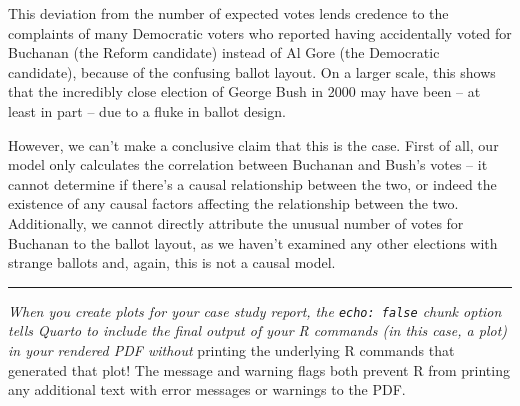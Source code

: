 \documentclass[
  letterpaper,
  DIV=11,
  numbers=noendperiod]{scrartcl}
\newenvironment{Shaded}{\begin{snugshade}}{\end{snugshade}}
\newcommand{\CommentTok}[1]{\textcolor[rgb]{0.37,0.37,0.37}{#1}}
\begin{document}
This deviation from the number of expected votes lends credence to the
complaints of many Democratic voters who reported having accidentally
voted for Buchanan (the Reform candidate) instead of Al Gore (the
Democratic candidate), because of the confusing ballot layout. On a
larger scale, this shows that the incredibly close election of George
Bush in 2000 may have been -- at least in part -- due to a fluke in
ballot design.

However, we can't make a conclusive claim that this is the case. First
of all, our model only calculates the correlation between Buchanan and
Bush's votes -- it cannot determine if there's a causal relationship
between the two, or indeed the existence of any causal factors affecting
the relationship between the two. Additionally, we cannot directly
attribute the unusual number of votes for Buchanan to the ballot layout,
as we haven't examined any other elections with strange ballots and,
again, this is not a causal model.

\begin{center}\rule{0.5\linewidth}{0.5pt}\end{center}

\emph{When you create plots for your case study report, the
\texttt{echo:\ false} chunk option tells Quarto to include the final
output of your R commands (in this case, a plot) in your rendered PDF
without} printing the underlying R commands that generated that plot!
The message and warning flags both prevent R from printing any
additional text with error messages or warnings to the PDF.

\begin{Shaded}
\end{Shaded}
\end{document}
